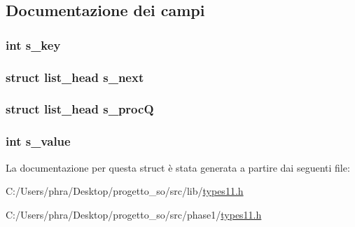 \subsection{Documentazione dei campi}
\hypertarget{structsemd__t_a2f9b394e0876b74e8f9e0a53c8aa7e0c}{
\subsubsection[{s\-\_\-key}]{\setlength{\rightskip}{0pt plus 5cm}int s\-\_\-key}}\label{structsemd__t_a2f9b394e0876b74e8f9e0a53c8aa7e0c}
\hypertarget{structsemd__t_a09cdbeceec30846f32399900706a408f}{
\subsubsection[{s\-\_\-next}]{\setlength{\rightskip}{0pt plus 5cm}struct {\bf list\-\_\-head} s\-\_\-next}}\label{structsemd__t_a09cdbeceec30846f32399900706a408f}
\hypertarget{structsemd__t_a9a531117316667eceb70495342c36be1}{
\subsubsection[{s\-\_\-proc\-Q}]{\setlength{\rightskip}{0pt plus 5cm}struct {\bf list\-\_\-head} s\-\_\-proc\-Q}}\label{structsemd__t_a9a531117316667eceb70495342c36be1}
\hypertarget{structsemd__t_a104d7150b55e51644df16fdc9814191f}{
\subsubsection[{s\-\_\-value}]{\setlength{\rightskip}{0pt plus 5cm}int s\-\_\-value}}\label{structsemd__t_a104d7150b55e51644df16fdc9814191f}


La documentazione per questa struct è stata generata a partire dai seguenti file\-:\begin{DoxyCompactItemize}
\item 
C\-:/\-Users/phra/\-Desktop/progetto\-\_\-so/src/lib/\hyperlink{lib_2types11_8h}{types11.\-h}\item 
C\-:/\-Users/phra/\-Desktop/progetto\-\_\-so/src/phase1/\hyperlink{phase1_2types11_8h}{types11.\-h}\end{DoxyCompactItemize}
